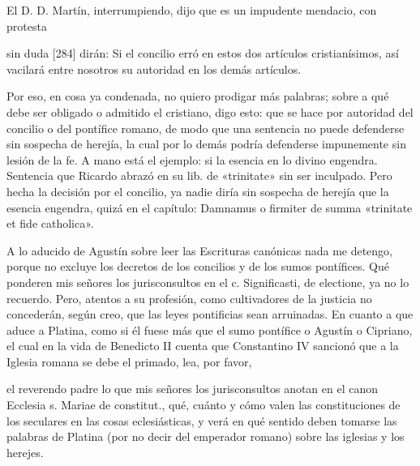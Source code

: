 El D. D. Martín, interrumpiendo, dijo que es un impudente mendacio, con protesta

sin duda [284] dirán: Si el concilio erró en estos dos artículos cristianísimos, así vacilará entre nosotros su autoridad en los demás artículos.

Por eso, en cosa ya condenada, no quiero prodigar más palabras; sobre a qué debe ser obligado o admitido el cristiano, digo esto: que se hace por autoridad del concilio o del pontífice romano, de modo que una sentencia no puede defenderse sin sospecha de herejía, la cual por lo demás podría defenderse impunemente sin lesión de la fe. A mano está el ejemplo: si la esencia en lo divino engendra. Sentencia que Ricardo abrazó en su lib. de «trinitate» sin ser inculpado. Pero hecha la decisión por el concilio, ya nadie diría sin sospecha de herejía que la esencia engendra, quizá en el capítulo: Damnamus o firmiter de summa «trinitate et fide catholica».

A lo aducido de Agustín sobre leer las Escrituras canónicas nada me detengo, porque no excluye los decretos de los concilios y de los sumos pontífices. Qué ponderen mis señores los jurisconsultos en el c. Significasti, de electione, ya no lo recuerdo. Pero, atentos a su profesión, como cultivadores de la justicia no concederán, según creo, que las leyes pontificias sean arruinadas. En cuanto a que aduce a Platina, como si él fuese más que el sumo pontífice o Agustín o Cipriano, el cual en la vida de Benedicto II cuenta que Constantino IV sancionó que a la Iglesia romana se debe el primado, lea, por favor,

el reverendo padre lo que mis señores los jurisconsultos anotan en el canon Ecclesia s. Mariae de constitut., qué, cuánto y cómo valen las constituciones de los seculares en las cosas eclesiásticas, y verá en qué sentido deben tomarse las palabras de Platina (por no decir del emperador romano) sobre las iglesias y los herejes.

